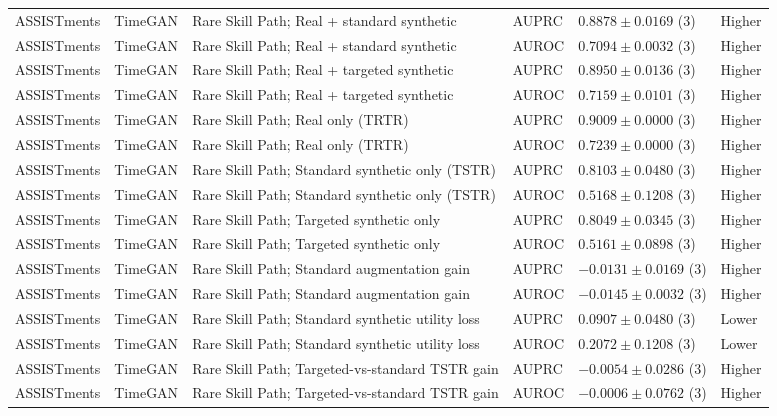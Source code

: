 \begin{longtable}{@{}p{2.25cm}p{2.05cm}p{4.7cm}p{5.0cm}p{2.6cm}p{1.25cm}@{}}
ASSISTments & TimeGAN & Rare Skill Path; Real + standard synthetic & AUPRC & $0.8878 \mathbin{\pm} 0.0169$ (3) & Higher \\
ASSISTments & TimeGAN & Rare Skill Path; Real + standard synthetic & AUROC & $0.7094 \mathbin{\pm} 0.0032$ (3) & Higher \\
ASSISTments & TimeGAN & Rare Skill Path; Real + targeted synthetic & AUPRC & $0.8950 \mathbin{\pm} 0.0136$ (3) & Higher \\
ASSISTments & TimeGAN & Rare Skill Path; Real + targeted synthetic & AUROC & $0.7159 \mathbin{\pm} 0.0101$ (3) & Higher \\
ASSISTments & TimeGAN & Rare Skill Path; Real only (TRTR) & AUPRC & $0.9009 \mathbin{\pm} 0.0000$ (3) & Higher \\
ASSISTments & TimeGAN & Rare Skill Path; Real only (TRTR) & AUROC & $0.7239 \mathbin{\pm} 0.0000$ (3) & Higher \\
ASSISTments & TimeGAN & Rare Skill Path; Standard synthetic only (TSTR) & AUPRC & $0.8103 \mathbin{\pm} 0.0480$ (3) & Higher \\
ASSISTments & TimeGAN & Rare Skill Path; Standard synthetic only (TSTR) & AUROC & $0.5168 \mathbin{\pm} 0.1208$ (3) & Higher \\
ASSISTments & TimeGAN & Rare Skill Path; Targeted synthetic only & AUPRC & $0.8049 \mathbin{\pm} 0.0345$ (3) & Higher \\
ASSISTments & TimeGAN & Rare Skill Path; Targeted synthetic only & AUROC & $0.5161 \mathbin{\pm} 0.0898$ (3) & Higher \\
ASSISTments & TimeGAN & Rare Skill Path; Standard augmentation gain & AUPRC & $-0.0131 \mathbin{\pm} 0.0169$ (3) & Higher \\
ASSISTments & TimeGAN & Rare Skill Path; Standard augmentation gain & AUROC & $-0.0145 \mathbin{\pm} 0.0032$ (3) & Higher \\
ASSISTments & TimeGAN & Rare Skill Path; Standard synthetic utility loss & AUPRC & $0.0907 \mathbin{\pm} 0.0480$ (3) & Lower \\
ASSISTments & TimeGAN & Rare Skill Path; Standard synthetic utility loss & AUROC & $0.2072 \mathbin{\pm} 0.1208$ (3) & Lower \\
ASSISTments & TimeGAN & Rare Skill Path; Targeted-vs-standard TSTR gain & AUPRC & $-0.0054 \mathbin{\pm} 0.0286$ (3) & Higher \\
ASSISTments & TimeGAN & Rare Skill Path; Targeted-vs-standard TSTR gain & AUROC & $-0.0006 \mathbin{\pm} 0.0762$ (3) & Higher \\

\end{longtable}
